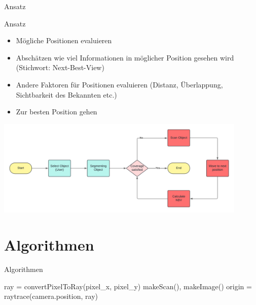 \documentclass{beamer}
\begin{document}
\begin{frame}{Ansatz}
	\begin{block}{Ansatz}
		\begin{itemize}
			\item Mögliche Positionen evaluieren
			\item Abschätzen wie viel Informationen in möglicher Position gesehen wird (Stichwort: Next-Best-View)
			\item Andere Faktoren für Positionen evaluieren (Distanz, Überlappung, Sichtbarkeit des Bekannten etc.)
			\item Zur besten Position gehen
		\end{itemize}
	\end{block}
	\centering
	\includegraphics[width=0.9\textwidth]{Graphics/flow_chart.png}
\end{frame}

\section{Algorithmen}
\begin{frame}{Algorithmen}
	\begin{algorithm}
		ray = convertPixelToRay(pixel_x, pixel_y)\;
		makeScan(), makeImage()\;
		origin = raytrace(camera.position, ray)\;
	\end{algorithm}
\end{frame}
\end{document}
